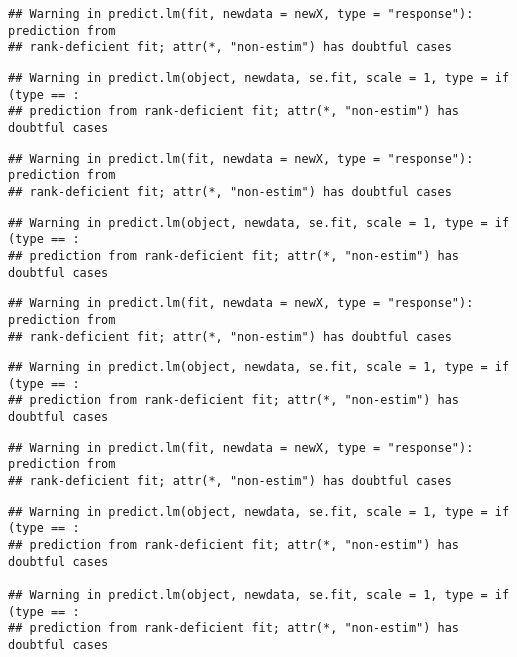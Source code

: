 \documentclass[
]{article}
\begin{document}
\begin{verbatim}
## Warning in predict.lm(fit, newdata = newX, type = "response"): prediction from
## rank-deficient fit; attr(*, "non-estim") has doubtful cases
\end{verbatim}

\begin{verbatim}
## Warning in predict.lm(object, newdata, se.fit, scale = 1, type = if (type == :
## prediction from rank-deficient fit; attr(*, "non-estim") has doubtful cases
\end{verbatim}

\begin{verbatim}
## Warning in predict.lm(fit, newdata = newX, type = "response"): prediction from
## rank-deficient fit; attr(*, "non-estim") has doubtful cases
\end{verbatim}

\begin{verbatim}
## Warning in predict.lm(object, newdata, se.fit, scale = 1, type = if (type == :
## prediction from rank-deficient fit; attr(*, "non-estim") has doubtful cases
\end{verbatim}

\begin{verbatim}
## Warning in predict.lm(fit, newdata = newX, type = "response"): prediction from
## rank-deficient fit; attr(*, "non-estim") has doubtful cases
\end{verbatim}

\begin{verbatim}
## Warning in predict.lm(object, newdata, se.fit, scale = 1, type = if (type == :
## prediction from rank-deficient fit; attr(*, "non-estim") has doubtful cases
\end{verbatim}

\begin{verbatim}
## Warning in predict.lm(fit, newdata = newX, type = "response"): prediction from
## rank-deficient fit; attr(*, "non-estim") has doubtful cases
\end{verbatim}

\begin{verbatim}
## Warning in predict.lm(object, newdata, se.fit, scale = 1, type = if (type == :
## prediction from rank-deficient fit; attr(*, "non-estim") has doubtful cases

## Warning in predict.lm(object, newdata, se.fit, scale = 1, type = if (type == :
## prediction from rank-deficient fit; attr(*, "non-estim") has doubtful cases
\end{verbatim}
\end{document}
